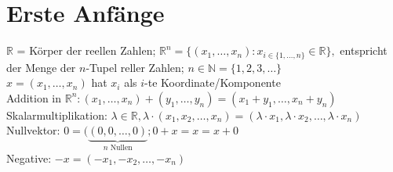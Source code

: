 \documentclass[12pt,a4paper]{article}
\theoremstyle{plain}
\newcommand{\N}{\mathbb{N}}
\newcommand{\R}{\mathbb{R}}
\numberwithin{equation}{section}
\begin{document}
\section{Erste Anfänge}
$\R$ = Körper der reellen Zahlen; $\R^n=\{(x_1,\ldots,x_n):x_{i\in \{1,\ldots,n\}}\in \R\},$ entspricht der Menge der $n$-Tupel reller Zahlen; $ n\in \N=\{1,2,3,\ldots\}$ \\
$x=(x_1,\ldots,x_n)$ hat $x_i$ als $i$-te Koordinate/Komponente\\
Addition in $\R^n: (x_1,\ldots,x_n) + (y_1,\ldots,y_n)=(x_1+y_1,\ldots,x_n+y_n)$\\
Skalarmultiplikation: $\lambda \in \R, \lambda\cdot (x_1,x_2,\ldots,x_n)=(\lambda\cdot x_1, \lambda \cdot x_2,\ldots, \lambda\cdot x_n)$\\
Nullvektor: $0=(\underbrace{(0,0,\ldots,0)}_{n \text{ Nullen}}; 0+x=x=x+0$\\
Negative: $-x=(-x_1,-x_2,\ldots,-x_n)$
\end{document}
